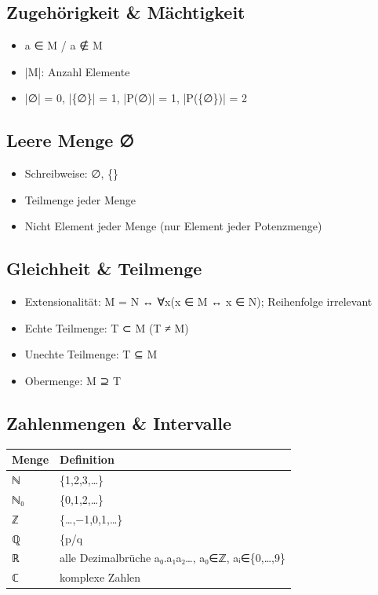 \documentclass[11pt, a4paper]{article}
\begin{document}
\subsection{Zugehörigkeit \& Mächtigkeit}

\begin{itemize}
  \item a ∈ M / a ∉ M
  \item |M|: Anzahl Elemente
  \item |∅| = 0, |\{∅\}| = 1, |P(∅)| = 1, |P(\{∅\})| = 2
\end{itemize}


\subsection{Leere Menge ∅}

\begin{itemize}
  \item Schreibweise: ∅, \{\}
  \item Teilmenge jeder Menge
  \item Nicht Element jeder Menge (nur Element jeder Potenzmenge)
\end{itemize}


\subsection{Gleichheit \& Teilmenge}

\begin{itemize}
  \item Extensionalität: M = N ↔ ∀x(x ∈ M ↔ x ∈ N); Reihenfolge irrelevant
  \item Echte Teilmenge: T ⊂ M (T ≠ M)
  \item Unechte Teilmenge: T ⊆ M
  \item Obermenge: M ⊇ T
\end{itemize}


\subsection{Zahlenmengen \& Intervalle}


{\small
\begin{tabularx}{\linewidth}{XX}
\hline
\rowcolor{tableheadbg}
{\color{white}\textbf{Menge}} & {\color{white}\textbf{Definition}} \\[2pt]
\hline
\endhead
\hline
\endfoot
ℕ & \{1,2,3,…\} \\
ℕ₀ & \{0,1,2,…\} \\
ℤ & \{…,−1,0,1,…\} \\
ℚ & \{p/q \\
ℝ & alle Dezimalbrüche a₀.a₁a₂…, a₀∈ℤ, aᵢ∈\{0,…,9\} \\
ℂ & komplexe Zahlen \\
\end{tabularx}
}
\end{document}
